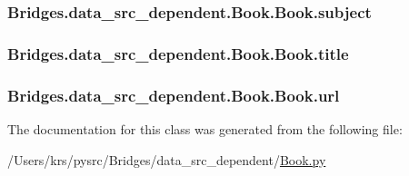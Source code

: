 \subsubsection[{subject}]{\setlength{\rightskip}{0pt plus 5cm}Bridges.\+data\+\_\+src\+\_\+dependent.\+Book.\+Book.\+subject}\label{class_bridges_1_1data__src__dependent_1_1_book_1_1_book_a5e4d7efd63c17423383ea755d1e05543}
\hypertarget{class_bridges_1_1data__src__dependent_1_1_book_1_1_book_a83b8679cabf2db52dbcd57c1f0264f32}{}
\subsubsection[{title}]{\setlength{\rightskip}{0pt plus 5cm}Bridges.\+data\+\_\+src\+\_\+dependent.\+Book.\+Book.\+title}\label{class_bridges_1_1data__src__dependent_1_1_book_1_1_book_a83b8679cabf2db52dbcd57c1f0264f32}
\hypertarget{class_bridges_1_1data__src__dependent_1_1_book_1_1_book_a4e2f9719a091a7bd9487a3beafb8ad79}{}
\subsubsection[{url}]{\setlength{\rightskip}{0pt plus 5cm}Bridges.\+data\+\_\+src\+\_\+dependent.\+Book.\+Book.\+url}\label{class_bridges_1_1data__src__dependent_1_1_book_1_1_book_a4e2f9719a091a7bd9487a3beafb8ad79}


The documentation for this class was generated from the following file\+:\begin{DoxyCompactItemize}
\item 
/\+Users/krs/pysrc/\+Bridges/data\+\_\+src\+\_\+dependent/\hyperlink{_book_8py}{Book.\+py}\end{DoxyCompactItemize}

